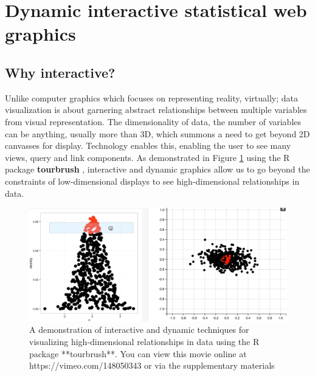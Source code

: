 \documentclass[11pt]{isuthesis}
\begin{document}
\section{Dynamic interactive statistical web
graphics}\label{dynamic-interactive-statistical-web-graphics}

\subsection{Why interactive?}\label{why-interactive}

Unlike computer graphics which focuses on representing reality,
virtually; data visualization is about garnering abstract relationships
between multiple variables from visual representation. The
dimensionality of data, the number of variables can be anything, usually
more than 3D, which summons a need to get beyond 2D canvasses for
display. Technology enables this, enabling the user to see many views,
query and link components. As demonstrated in Figure \ref{fig:tour}
using the R package \textbf{tourbrush} \citep{tourbrush}, interactive
and dynamic graphics allow us to go beyond the constraints of
low-dimensional displays to see high-dimensional relationships in data.

\begin{figure}

{\centering \includegraphics[width=26.64in]{diagrams/tourbrush} 

}

\caption{A demonstration of interactive and dynamic techniques for visualizing high-dimensional relationships in data using the R package **tourbrush**. You can view this movie online at https://vimeo.com/148050343 or via the supplementary materials}\label{fig:tour}
\end{figure}
\end{document}
